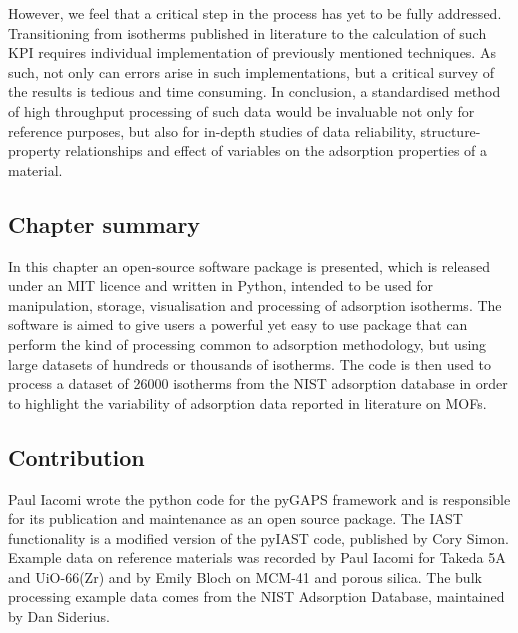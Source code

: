 However, we feel that a critical step in the process has yet
to be fully addressed. Transitioning from isotherms published in
literature to the calculation of such \gls{KPI} requires individual
implementation of previously mentioned techniques. As such,
not only can errors arise in such implementations, but
a critical survey of the results is tedious and time consuming.
In conclusion, a standardised method of high throughput processing
of such data would be invaluable not only for reference purposes,
but also for in-depth studies of data reliability,
structure-property relationships and effect of variables on
the adsorption properties of a material.

\subsection*{Chapter summary}

In this chapter an open-source software package is presented, which
is released under an MIT licence and written in Python, intended to be
used for manipulation, storage, visualisation and processing of
adsorption isotherms. The software is aimed to give users a powerful
yet easy to use package that can perform the kind of processing
common to adsorption methodology, but using large datasets of hundreds
or thousands of isotherms. The code is then used to process a
dataset of 26000 isotherms from the NIST adsorption database in order
to highlight the variability of adsorption data reported in literature
on MOFs.

\subsection*{Contribution}

Paul Iacomi wrote the python code for the pyGAPS framework and is
responsible for its publication and maintenance as an open source
package. The IAST functionality is a modified version of
the pyIAST code, published by Cory Simon. Example data on reference 
materials was recorded by Paul Iacomi for Takeda 5A and UiO-66(Zr) 
and by Emily Bloch on MCM-41 and porous silica. The bulk processing
example data comes from the NIST Adsorption Database, 
maintained by Dan Siderius.

